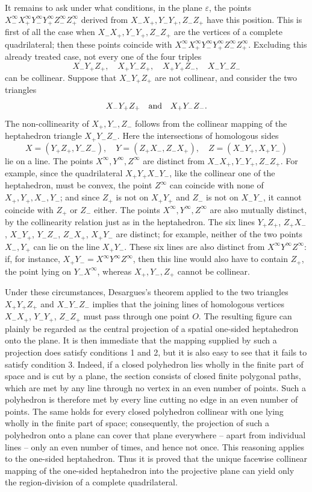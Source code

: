 \documentclass[11pt,a4paper]{article}
\begin{document}
It remains to ask under what conditions, in the plane $\varepsilon$, the points $X_-^\infty X_+^\infty Y_-^\infty Y_+^\infty Z_-^\infty Z_+^\infty$ derived from $X_-X_+,Y_-Y_+,Z_-Z_+$ have this position. This is first of all the case when $X_-X_+,Y_-Y_+,Z_-Z_+$ are the vertices of a complete quadrilateral; then these points coincide with $X_-^\infty X_+^\infty Y_-^\infty Y_+^\infty Z_-^\infty Z_+^\infty$. Excluding this already treated case, not every one of the four triples
\[
 X_-Y_+Z_+,
 \quad X_+Y_-Z_+,
 \quad X_+Y_+Z_-,
 \quad X_-Y_-Z_-
\]
can be collinear. Suppose that $X_-Y_+Z_+$ are not collinear, and consider the two triangles
\[
 X_-Y_+Z_+
 \quad\hbox{and}\quad
 X_+Y_-Z_-.
\]
The non-collinearity of $X_+,Y_-,Z_-$ follows from the collinear mapping of the heptahedron triangle $X_+Y_-Z_-$. Here the intersections of homologous sides
\[
 X=(Y_+Z_+,Y_-Z_-),
 \quad Y=(Z_+X_-,Z_-X_+),
 \quad Z=(X_-Y_+,X_+Y_-)
\]
lie on a line. The points $X^\infty,Y^\infty,Z^\infty$ are distinct from $X_-X_+,Y_-Y_+,Z_-Z_+$. For example, since the quadrilateral $X_+Y_+X_-Y_-$, like the collinear one of the heptahedron, must be convex, the point $Z^\infty$ can coincide with none of $X_+,Y_+,X_-,Y_-$; and since $Z_+$ is not on $X_+Y_+$ and $Z_-$ is not on $X_-Y_-$, it cannot coincide with $Z_+$ or $Z_-$ either. The points $X^\infty,Y^\infty,Z^\infty$ are also mutually distinct, by the collinearity relation just as in the heptahedron. The six lines $Y_+Z_+$, $Z_+X_-$, $X_-Y_+$, $Y_-Z_-$, $Z_-X_+$, $X_+Y_-$ are distinct; for example, neither of the two points $X_-,Y_+$ can lie on the line $X_+Y_-$. These six lines are also distinct from $X^\infty Y^\infty Z^\infty$: if, for instance, $X_+Y_-=X^\infty Y^\infty Z^\infty$, then this line would also have to contain $Z_+$, the point lying on $Y_-X^\infty$, whereas $X_+,Y_-,Z_+$ cannot be collinear.

Under these circumstances, Desargues's theorem applied to the two triangles $X_+Y_+Z_+$ and $X_-Y_-Z_-$ implies that the joining lines of homologous vertices $X_-X_+$, $Y_-Y_+$, $Z_-Z_+$ must pass through one point $O$. The resulting figure can plainly be regarded as the central projection of a spatial one-sided heptahedron onto the plane. It is then immediate that the mapping supplied by such a projection does satisfy conditions 1 and 2, but it is also easy to see that it fails to satisfy condition 3. Indeed, if a closed polyhedron lies wholly in the finite part of space and is cut by a plane, the section consists of closed finite polygonal paths, which are met by any line through no vertex in an even number of points. Such a polyhedron is therefore met by every line cutting no edge in an even number of points. The same holds for every closed polyhedron collinear with one lying wholly in the finite part of space; consequently, the projection of such a polyhedron onto a plane can cover that plane everywhere -- apart from individual lines -- only an even number of times, and hence not once. This reasoning applies to the one-sided heptahedron. Thus it is proved that the unique facewise collinear mapping of the one-sided heptahedron into the projective plane can yield only the region-division of a complete quadrilateral.
\end{document}
